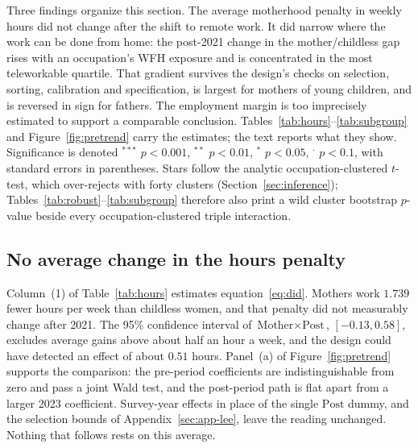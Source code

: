 \documentclass[12pt,a4paper]{article}
\newcommand{\sym}[1]{\ensuremath{^{#1}}}
\newcommand{\Mother}{\text{Mother}}
\newcommand{\Post}{\text{Post}}
\begin{document}
Three findings organize this section. The average motherhood penalty in weekly hours did not
change after the shift to remote work. It did narrow where the work can be done from home: the
post-2021 change in the mother/childless gap rises with an occupation's WFH exposure and is
concentrated in the most teleworkable quartile. That gradient survives the design's checks on
selection, sorting, calibration and specification, is largest for mothers of young children, and
is reversed in sign for fathers. The employment margin is too imprecisely estimated to support a
comparable conclusion. Tables~\ref{tab:hours}--\ref{tab:subgroup} and Figure~\ref{fig:pretrend}
carry the estimates; the text reports what they show. Significance is denoted \sym{***}
$p<0.001$, \sym{**} $p<0.01$, \sym{*} $p<0.05$, \sym{\cdot} $p<0.1$, with standard errors in
parentheses. Stars follow the analytic occupation-clustered $t$-test, which over-rejects with
forty clusters (Section~\ref{sec:inference}); Tables~\ref{tab:robust}--\ref{tab:subgroup}
therefore also print a wild cluster bootstrap $p$-value beside every occupation-clustered triple
interaction.

\subsection{No average change in the hours penalty}\label{sec:res-did}

Column~(1) of Table~\ref{tab:hours} estimates equation~\eqref{eq:did}. Mothers work $1.739$ fewer
hours per week than childless women, and that penalty did not measurably change after 2021. The
95\% confidence interval of $\Mother \times \Post$, $[-0.13, 0.58]$, excludes average gains above
about half an hour a week, and the design could have detected an effect of about $0.51$ hours.
Panel~(a) of Figure~\ref{fig:pretrend} supports the comparison: the pre-period coefficients are
indistinguishable from zero and pass a joint Wald test, and the post-period path is flat apart
from a larger 2023 coefficient. Survey-year effects in place of the
single $\Post$ dummy, and the selection bounds of Appendix~\ref{sec:app-lee}, leave the reading
unchanged. Nothing that follows rests on this average.
\end{document}
